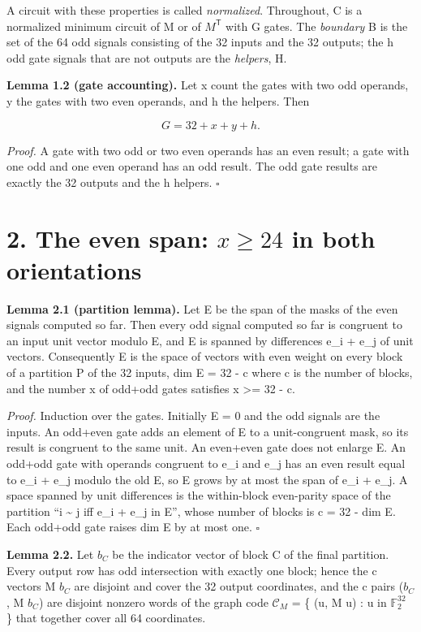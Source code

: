 A circuit with these properties is called \emph{normalized}. Throughout, C is a normalized minimum circuit of M or of \(M^{\mathsf T}\) with G gates. The \emph{boundary} B is the set of the 64 odd signals consisting of the 32 inputs and the 32 outputs; the h odd gate signals that are not outputs are the \emph{helpers}, H.

\textbf{Lemma 1.2 (gate accounting).} Let x count the gates with two odd operands, y the gates with two even operands, and h the helpers. Then

\[
G=32+x+y+h.
\]

\emph{Proof.} A gate with two odd or two even operands has an even result; a gate with one odd and one even operand has an odd result. The odd gate results are exactly the 32 outputs and the h helpers. \(\square\)

\hypertarget{the-even-span-xge24-in-both-orientations}{%
\section{\texorpdfstring{2. The even span: \(x\ge24\) in both orientations}{2. The even span: x\textbackslash ge24 in both orientations}}\label{the-even-span-xge24-in-both-orientations}}

\textbf{Lemma 2.1 (partition lemma).} Let E be the span of the masks of the even signals computed so far. Then every odd signal computed so far is congruent to an input unit vector modulo E, and E is spanned by differences e\_i + e\_j of unit vectors. Consequently E is the space of vectors with even weight on every block of a partition P of the 32 inputs, dim E = 32 - c where c is the number of blocks, and the number x of odd+odd gates satisfies x \textgreater= 32 - c.

\emph{Proof.} Induction over the gates. Initially E = 0 and the odd signals are the inputs. An odd+even gate adds an element of E to a unit-congruent mask, so its result is congruent to the same unit. An even+even gate does not enlarge E. An odd+odd gate with operands congruent to e\_i and e\_j has an even result equal to e\_i + e\_j modulo the old E, so E grows by at most the span of e\_i + e\_j. A space spanned by unit differences is the within-block even-parity space of the partition ``i \textasciitilde{} j iff e\_i + e\_j in E'', whose number of blocks is c = 32 - dim E. Each odd+odd gate raises dim E by at most one. \(\square\)

\textbf{Lemma 2.2.} Let \(b_C\) be the indicator vector of block C of the final partition. Every output row has odd intersection with exactly one block; hence the c vectors M \(b_C\) are disjoint and cover the 32 output coordinates, and the c pairs (\(b_C\), M \(b_C\)) are disjoint nonzero words of the graph code \(\mathcal C_M\) = \{ (u, M u) : u in \(\mathbb F_2^{32}\) \} that together cover all 64 coordinates.

